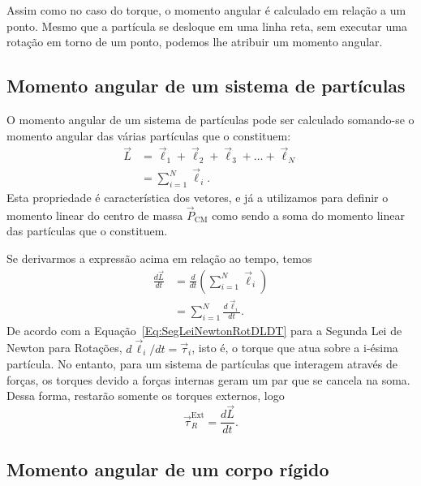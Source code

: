 Assim como no caso do torque, o momento angular é calculado em relação a um ponto. Mesmo que a partícula se desloque em uma linha reta, sem executar uma rotação em torno de um ponto, podemos lhe atribuir um momento angular.

\subsection{Momento angular de um sistema de partículas}

O momento angular de um sistema de partículas pode ser calculado somando-se o momento angular das várias partículas que o constituem:
\begin{align}
  \vec{L} &= \vec{\ell}_1 + \vec{\ell}_2 + \vec{\ell}_3 + \dots + \vec{\ell}_N \\
  &= \sum_{i=1}^N \vec{\ell}_i.
\end{align}
%
Esta propriedade é característica dos vetores, e já a utilizamos para definir o momento linear do centro de massa $\vec{P}_{\textrm{CM}}$ como sendo a soma do momento linear das partículas que o constituem.

Se derivarmos a expressão acima em relação ao tempo, temos
\begin{align}
  \frac{d\vec{L}}{dt} &= \frac{d}{dt}\left(\sum_{i=1}^N\vec{\ell}_i\right) \\
  &= \sum_{i=1}^N \frac{d\vec{\ell}_i}{dt}.
\end{align}
%
De acordo com a Equação~\ref{Eq:SegLeiNewtonRotDLDT} para a Segunda Lei de Newton para Rotações, $d\vec{\ell}_i/dt = \vec{\tau}_i$, isto é, o torque que atua sobre a i-ésima partícula. No entanto, para um sistema de partículas que interagem através de forças, os torques devido a forças internas geram um par que se cancela na soma. Dessa forma, restarão somente os torques externos, logo
\begin{equation}\label{Eq:SegLeiNewtonRotSisPartDLDT}
  \vec{\tau}_R^{\textrm{Ext}} = \frac{d\vec{L}}{dt}.
\end{equation}

\subsection{Momento angular de um corpo rígido}

